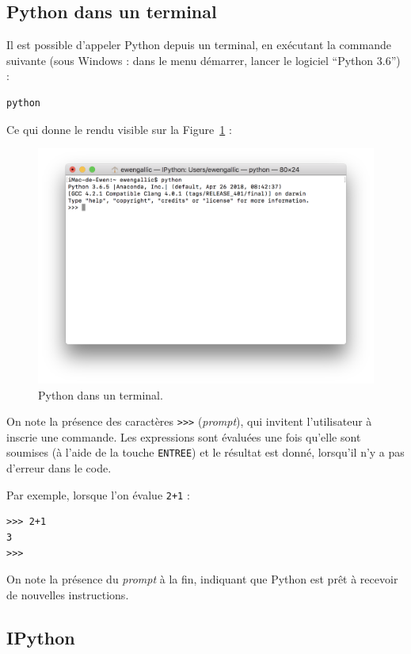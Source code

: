 \documentclass[12pt,]{book}
\numberwithin{equation}{section}
\numberwithin{countremarque}{section}
\begin{document}
\subsection{Python dans un terminal}\label{python-dans-un-terminal}

Il est possible d'appeler Python depuis un terminal, en exécutant la
commande suivante (sous Windows : dans le menu démarrer, lancer le
logiciel ``Python 3.6'') :

\begin{lstlisting}
python
\end{lstlisting}

Ce qui donne le rendu visible sur la
Figure~\ref{fig:intro-python-terminal} :

\begin{figure}[H]

{\centering \includegraphics[width=0.7\linewidth]{figs/python_terminal} 

}

\caption{Python dans un terminal.}\label{fig:intro-python-terminal}
\end{figure}

On note la présence des caractères
\texttt{\textgreater{}\textgreater{}\textgreater{}} (\emph{prompt}), qui
invitent l'utilisateur à inscrie une commande. Les expressions sont
évaluées une fois qu'elle sont soumises (à l'aide de la touche
\texttt{ENTREE}) et le résultat est donné, lorsqu'il n'y a pas d'erreur
dans le code.

Par exemple, lorsque l'on évalue \texttt{2+1} :

\begin{lstlisting}
>>> 2+1
3
>>>
\end{lstlisting}

On note la présence du \emph{prompt} à la fin, indiquant que Python est
prêt à recevoir de nouvelles instructions.

\subsection{IPython}\label{ipython}
\end{document}
